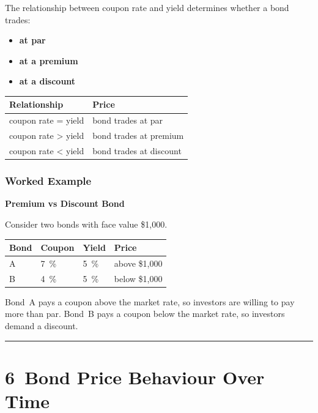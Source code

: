 \documentclass[
  letterpaper,
  DIV=11,
  numbers=noendperiod]{scrartcl}
\providecommand{\tightlist}{%
  \setlength{\itemsep}{0pt}\setlength{\parskip}{0pt}}
\begin{document}
The relationship between coupon rate and yield determines whether a bond
trades:

\begin{itemize}
\tightlist
\item
  \textbf{at par}\\
\item
  \textbf{at a premium}\\
\item
  \textbf{at a discount}
\end{itemize}

\begin{longtable}[]{@{}ll@{}}
\toprule\noalign{}
Relationship & Price \\
\midrule\noalign{}
\endhead
\bottomrule\noalign{}
\endlastfoot
coupon rate = yield & bond trades at par \\
coupon rate \textgreater{} yield & bond trades at premium \\
coupon rate \textless{} yield & bond trades at discount \\
\end{longtable}

\subsubsection{Worked Example}\label{worked-example-2}

\textbf{Premium vs Discount Bond}

Consider two bonds with face value \$1,000.

\begin{longtable}[]{@{}llll@{}}
\toprule\noalign{}
Bond & Coupon & Yield & Price \\
\midrule\noalign{}
\endhead
\bottomrule\noalign{}
\endlastfoot
A & 7~\% & 5~\% & above \$1,000 \\
B & 4~\% & 5~\% & below \$1,000 \\
\end{longtable}

Bond~A pays a coupon above the market rate, so investors are willing to
pay more than par. Bond~B pays a coupon below the market rate, so
investors demand a discount.

\begin{center}\rule{0.5\linewidth}{0.5pt}\end{center}

\section{6~Bond Price Behaviour Over
Time}\label{bond-price-behaviour-over-time}
\end{document}
